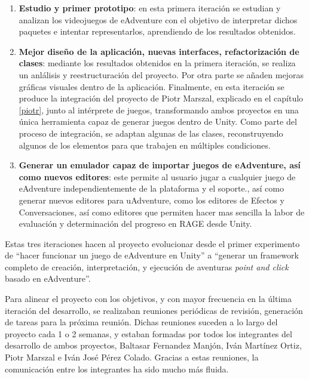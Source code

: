 \begin{enumerate}
	\item \textbf{Estudio y primer prototipo}: en esta primera iteración se estudian y analizan los videojuegos de eAdventure con el objetivo de interpretar dichos paquetes e intentar representarlos, aprendiendo de los resultados obtenidos. 
	
	\item \textbf{Mejor diseño de la aplicación, nuevas interfaces, refactorización de clases}: mediante los resultados obtenidos en la primera iteración, se realiza un anlálisis y reestructuración del proyecto. Por otra parte se añaden mejoras gráficas visuales dentro de la aplicación. Finalmente, en esta iteración se produce la integración del proyecto de Piotr Marszal, explicado en el capítulo \ref{piotr}, junto al intérprete de juegos, transformando ambos proyectos en una única herramienta capaz de generar juegos dentro de Unity. Como parte del proceso de integración, se adaptan algunas de las clases, reconstruyendo algunos de los elementos para que trabajen en múltiples condiciones.
	
	\item \textbf{Generar un emulador capaz de importar juegos de eAdventure, así como nuevos editores}: este permite al usuario jugar a cualquier juego de eAdventure independientemente de la plataforma y el soporte., así como generar nuevos editores para uAdventure, como los editores de Efectos y Conversaciones, así como editores que permiten hacer mas sencilla la labor de evaluación y determinación del progreso en RAGE desde Unity.
\end{enumerate}

Estas tres iteraciones hacen al proyecto evolucionar desde el primer experimento de ``hacer funcionar un juego de eAdventure en Unity'' a ``generar un framework completo de creación, interpretación, y ejecución de aventuras \textit{point and click} basado en eAdventure''. 

Para alinear el proyecto con los objetivos, y con mayor frecuencia en la última iteración del desarrollo, se realizaban reuniones periódicas de revisión, generación de tareas para la próxima reunión. Dichas reuniones suceden a lo largo del proyecto cada 1 o 2 semanas, y estaban formadas por todos los integrantes del desarrollo de ambos proyectos, Baltasar Fernandez Manjón, Iván Martínez Ortiz, Piotr Marszal e Iván José Pérez Colado. Gracias a estas reuniones, la comunicación entre los integrantes ha sido mucho más fluida.

